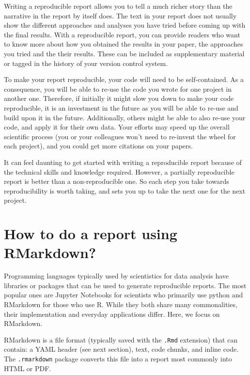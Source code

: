 \documentclass[
]{book}
\begin{document}
Writing a reproducible report allows you to tell a much richer story than the narrative in the report by itself does. The text in your report does not usually show the different approaches and analyses you have tried before coming up with the final results. With a reproducible report, you can provide readers who want to know more about how you obtained the results in your paper, the approaches you tried and the their results. These can be included as supplementary material or tagged in the history of your version control system.

To make your report reproducible, your code will need to be self-contained. As a consequence, you will be able to re-use the code you wrote for one project in another one. Therefore, if initially it might slow you down to make your code reproducible, it is an investment in the future as you will be able to re-use and build upon it in the future. Additionally, others might be able to also re-use your code, and apply it for their own data. Your efforts may speed up the overall scientific process (you or your colleagues won't need to re-invent the wheel for each project), and you could get more citations on your papers.

It can feel daunting to get started with writing a reproducible report because of the technical skills and knowledge required. However, a partially reproducible report is better than a non-reproducible one. So each step you take towards reproducibility is worth taking, and sets you up to take the next one for the next project.

\hypertarget{how-to-do-a-report-using-rmarkdown}{%
\section{How to do a report using RMarkdown?}\label{how-to-do-a-report-using-rmarkdown}}

Programming languages typically used by scientistics for data analysis have libraries or packages that can be used to generate reproducible reports. The most popular ones are Jupyter Notebooks for scientists who primarily use python and RMarkdown for those who use R. While they both share many commonalities, their implementation and everyday applications differ. Here, we focus on RMarkdown.

RMarkdown is a file format (typically saved with the \texttt{.Rmd} extension) that can contain: a YAML header (see next section), text, code chunks, and inline code. The \texttt{.rmarkdown} package converts this file into a report most commonly into HTML or PDF.
\end{document}
